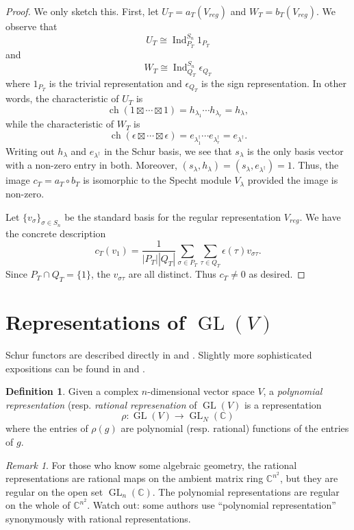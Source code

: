 \documentclass[12pt]{article}
\theoremstyle{plain}
\theoremstyle{definition}
\newtheorem{definition}[theorem]{Definition}
\theoremstyle{remark}
\newtheorem{remark}[theorem]{Remark}
\numberwithin{equation}{section}
\begin{document}
\begin{proof}
We only sketch this.
First, let $U_T = a_T(V_{reg})$ and $W_T = b_T(V_{reg})$.
We observe that
\[
U_T \cong \operatorname{Ind}_{P_T}^{S_n} 1_{P_T}
\]
and
\[
W_T \cong \operatorname{Ind}_{Q_T}^{S_n} \epsilon_{Q_T}
\]
where $1_{P_T}$ is the trivial representation and $\epsilon_{Q_T}$ is the sign
representation.
In other words, the characteristic of $U_T$ is
\[
\operatorname{ch}(1 \boxtimes \cdots \boxtimes 1)
= h_{\lambda_1} \cdots h_{\lambda_r} = h_\lambda,
\]
while the characteristic of $W_T$ is
\[
\operatorname{ch}(\epsilon \boxtimes \cdots \boxtimes \epsilon)
= e_{\lambda^\dag_1} \cdots e_{\lambda^\dag_r} = e_{\lambda^\dag}.
\]
Writing out $h_\lambda$ and $e_{\lambda^\dag}$ in the Schur basis,
we see that $s_\lambda$ is the only basis vector with a non-zero entry
in both.
Moreover, $(s_\lambda,h_\lambda)=(s_\lambda,e_{\lambda^\dag})=1$.
Thus, the image $c_T = a_T \circ b_T$ is isomorphic to the Specht module
$V_\lambda$ provided the image is non-zero.

Let $\{ v_\sigma \}_{\sigma \in S_n}$ be the standard basis for the regular
representation $V_{reg}$.
We have the concrete description
\[
c_T(v_{1})  = \frac{1}{|P_T| |Q_T|}\sum_{\sigma \in P_T}\sum_{\tau \in Q_T}
\epsilon(\tau) v_{\sigma\tau} .
\]
Since $P_T \cap Q_T = \{1\}$, the $v_{\sigma\tau}$ are all distinct.
Thus $c_T \ne 0$ as desired.
\end{proof}

\section{Representations of $\operatorname{GL}(V)$}

Schur functors are described directly in
\cite[\S{6}]{FultonHarris} and \cite[\S{5.19,5.20-23}]{Etingof}.
Slightly more sophisticated expositions can be found in
\cite[Appendix 7.2]{Stanley2} and \cite[Appendix I.A]{Macdonald}.

\begin{definition}
Given a complex $n$-dimensional vector space $V$,
a \emph{polynomial representation} (resp. \emph{rational represenation} of
$\operatorname{GL}(V)$ is a representation
\[
\rho : \operatorname{GL}(V) \to \operatorname{GL}_N(\mathbb{C})
\]
where the entries of $\rho(g)$ are polynomial (resp. rational)
functions of the entries of $g$.
\end{definition}

\begin{remark}
For those who know some algebraic geometry,
the rational representations are rational maps on the ambient matrix
ring $\mathbb{C}^{n^2}$, but they are regular on the open set
$\operatorname{GL}_n(\mathbb{C})$.
The polynomial representations are regular on the whole of
$\mathbb{C}^{n^2}$.
Watch out: some authors use ``polynomial representation'' synonymously with
rational representations.
\end{remark}
\end{document}
